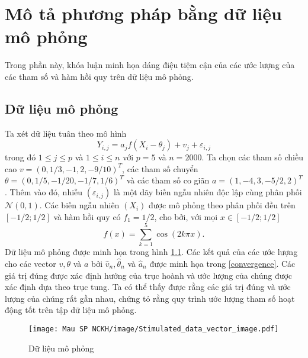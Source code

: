 \chapter{Mô tả phương pháp bằng dữ liệu mô phỏng}
Trong phần này, khóa luận minh họa dáng điệu tiệm cận của các ước lượng của các tham số và hàm hồi quy trên dữ liệu mô phỏng.

\section{Dữ liệu mô phỏng} 
Ta xét dữ liệu tuân theo mô hình 
$$
Y_{i, j}=a_{j} f\left(X_{i}-\theta_{j}\right)+v_{j}+\varepsilon_{i, j}
$$
trong đó $1 \leq j \leq p$ và $1 \leq i \leq n$ với $p=5$ và $n=2000$. Ta chọn các tham số chiều cao $v=(0,1 / 3,-1,2,-9 / 10)^{T}$, các tham số chuyển $\theta=(0,1 / 5,-1 / 20,-1 / 7,1 / 6)^{T}$ và các tham số co giãn $a=(1,-4,3,-5 / 2,2)^{T}$. Thêm vào đó, nhiễu $\left(\varepsilon_{i, j}\right)$ là một dãy biến ngẫu nhiên độc lập cùng phân phối $\mathcal{N}(0,1)$. Các biến ngẫu nhiên $\left(X_{i}\right)$ được mô phỏng  theo phân phối đều trên $[-1 / 2 ; 1 / 2]$ và hàm hồi quy có $f_{1}=1 / 2$, cho bởi, với mọi $x \in[-1 / 2 ; 1 / 2]$
$$
f(x)=\sum_{k=1}^{5} \cos (2 k \pi x).
$$
Dữ liệu mô phỏng được minh họa trong hình \ref{simulatedata}. Các kết quả của các ước lượng cho các vector $v, \theta$ và $a$ bởi $\widehat{v}_{n}, \widehat{\theta}_{n}$ và $\widehat{a}_{n}$ được minh họa trong \ref{convergence}. Các giá trị đúng được xác định hướng của trục hoành và ước lượng của chúng được xác định dựa theo trục tung. Ta có thể thấy được rằng các giá trị đúng và ước lượng của chúng rất gần nhau, chứng tỏ rằng quy trình ước lượng tham số hoạt động tốt trên tập dữ liệu mô phỏng.

\begin{figure}[ht]
  \centering
  \texttt{[image: Mau SP NCKH/image/Stimulated\_data\_vector\_image.pdf]}
  \caption{Dữ liệu mô phỏng}
  \label{simulatedata}
\end{figure}

